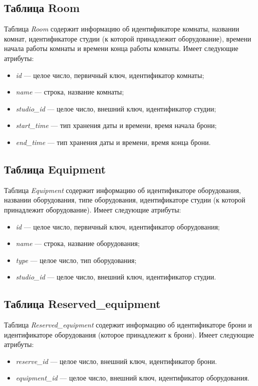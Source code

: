 \subsection{Таблица Room}
Таблица \textit{Room} содержит информацию об идентификаторе комнаты, названии комнат, идентификаторе студии (к которой принадлежит оборудование), времени начала работы комнаты и времени конца работы комнаты.
Имеет следующие атрибуты:
\begin{itemize}
	\item \textit{id} --- целое число, первичный ключ, идентификатор комнаты;
	\item \textit{name} --- строка, название комнаты;
	\item \textit{studio\_id} --- целое число, внешний ключ, идентификатор студии;
	\item \textit{start\_time} --- тип хранения даты и времени, время начала брони;
	\item \textit{end\_time} --- тип хранения даты и времени, время конца брони.
\end{itemize}
\subsection{Таблица Equipment}
Таблица \textit{Equipment} содержит информацию об идентификаторе оборудования, названии оборудования, типе оборудования, идентификаторе студии (к которой принадлежит оборудование).
Имеет следующие атрибуты:
\begin{itemize}
	\item \textit{id} --- целое число, первичный ключ, идентификатор оборудования;
	\item \textit{name} --- строка, название оборудования;
	\item \textit{type} --- целое число, тип оборудования;
	\item \textit{studio\_id} --- целое число, внешний ключ, идентификатор студии.
\end{itemize}
\subsection{Таблица Reserved\_equipment}
Таблица \textit{Reserved\_equipment} содержит информацию об идентификаторе брони и идентификаторе оборудования (которое принадлежит к брони).
Имеет следующие атрибуты:
\begin{itemize}
	\item \textit{reserve\_id} --- целое число, внешний ключ, идентификатор брони.
	\item \textit{equipment\_id} --- целое число, внешний ключ, идентификатор оборудования.
\end{itemize}
